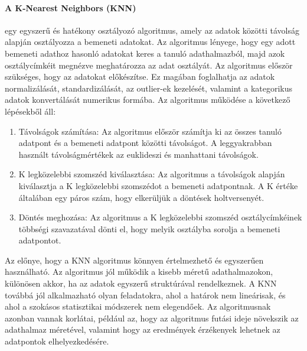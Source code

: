 \documentclass[acmtog, authorversion]{acmart}
\begin{document}
\paragraph{A K-Nearest Neighbors (KNN)} egy egyszerű és hatékony osztályozó algoritmus, amely az adatok közötti távolság alapján osztályozza a bemeneti adatokat. Az algoritmus lényege, hogy egy adott bemeneti adathoz hasonló adatokat keres a tanuló adathalmazból, majd azok osztálycímkéit megnézve meghatározza az adat osztályát. 
Az algoritmus először szükséges, hogy az adatokat előkészítse. Ez magában foglalhatja az adatok normalizálását, standardizálását, az outlier-ek kezelését, valamint a kategorikus adatok konvertálását numerikus formába.
Az algoritmus működése a következő lépésekből áll:
\begin{enumerate}
    \item Távolságok számítása: Az algoritmus először számítja ki az összes tanuló adatpont és a bemeneti adatpont közötti távolságot. A leggyakrabban használt távolságmértékek az euklideszi és manhattani távolságok.
    \item K legközelebbi szomszéd kiválasztása: Az algoritmus a távolságok alapján kiválasztja a K legközelebbi szomszédot a bemeneti adatpontnak. A K értéke általában egy páros szám, hogy elkerüljük a döntések holtversenyét.
    \item Döntés meghozása: Az algoritmus a K legközelebbi szomszéd osztálycímkéinek többségi szavazatával dönti el, hogy melyik osztályba sorolja a bemeneti adatpontot.
\end{enumerate}
Az előnye, hogy a KNN algoritmus könnyen értelmezhető és egyszerűen használható. Az algoritmus jól működik a kisebb méretű adathalmazokon, különösen akkor, ha az adatok egyszerű struktúrával rendelkeznek. A KNN továbbá jól alkalmazható olyan feladatokra, ahol a határok nem lineárisak, és ahol a szokásos statisztikai módszerek nem elegendőek. Az algoritmusnak azonban vannak korlátai, például az, hogy az algoritmus futási ideje növekszik az adathalmaz méretével, valamint hogy az eredmények érzékenyek lehetnek az adatpontok elhelyezkedésére.
\end{document}
